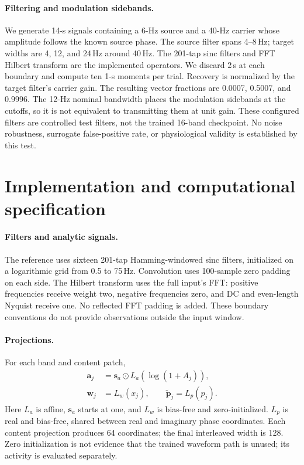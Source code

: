 \documentclass[10pt,twocolumn,letterpaper]{article}
\begin{document}
\paragraph{Filtering and modulation sidebands.}
We generate 14-s signals containing a 6-Hz source and a 40-Hz carrier
whose amplitude follows the known source phase. The source filter spans
4--8\,Hz; target widths are 4, 12, and 24\,Hz around 40\,Hz. The
201-tap sinc filters and FFT Hilbert transform are the implemented
operators. We discard 2\,s at each boundary and compute ten 1-s moments
per trial. Recovery is normalized by the target filter's carrier gain.
The resulting vector fractions are 0.0007, 0.5007, and 0.9996.
The 12-Hz nominal bandwidth places the modulation sidebands at the
cutoffs, so it is not equivalent to transmitting them at unit gain.
These configured filters are controlled test filters, not the trained
16-band checkpoint. No noise robustness, surrogate false-positive rate,
or physiological validity is established by this test.

\section{Implementation and computational specification}
\label{app:implementation}
\paragraph{Filters and analytic signals.}
The reference uses sixteen 201-tap Hamming-windowed sinc filters,
initialized on a logarithmic grid from 0.5 to 75\,Hz.
Convolution uses 100-sample zero padding on each side. The Hilbert
transform uses the full input's FFT: positive frequencies receive weight
two, negative frequencies zero, and DC and even-length Nyquist receive
one. No reflected FFT padding is added. These boundary conventions do
not provide observations outside the input window.

\paragraph{Projections.}
For each band and content patch,
\begin{equation}
\begin{aligned}
\mathbf a_j&=\mathbf s_a\odot L_a(\log(1+A_j)),\\
\mathbf w_j&=L_w(x_j),\qquad
\tilde{\mathbf p}_j=L_p(p_j).
\end{aligned}
\label{eq:projections}
\end{equation}
Here $L_a$ is affine, $\mathbf s_a$ starts at one, and $L_w$ is
bias-free and zero-initialized. $L_p$ is real and bias-free, shared
between real and imaginary phase coordinates. Each content projection
produces 64 coordinates; the final interleaved width is 128.
Zero initialization is not evidence that the trained waveform path is
unused; its activity is evaluated separately.
\end{document}
